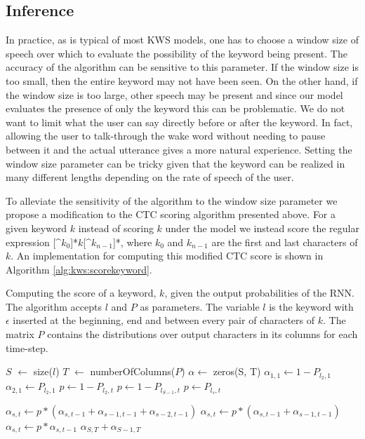 \subsection{Inference}

In practice, as is typical of most KWS models, one has to choose a window size
of speech over which to evaluate the possibility of the keyword being present.
The accuracy of the algorithm can be sensitive to this parameter. If the window
size is too small, then the entire keyword may not have been seen. On the other
hand, if the window size is too large, other speech may be present and since
our model evaluates the presence of only the keyword this can be problematic.
We do not want to limit what the user can say directly before or after the
keyword. In fact, allowing the user to talk-through the wake word without
needing to pause between it and the actual utterance gives a more natural
experience. Setting the window size parameter can be tricky given that the
keyword can be realized in many different lengths depending on the rate of
speech of the user.

To alleviate the sensitivity of the algorithm to the window size parameter we
propose a modification to the CTC scoring algorithm presented above. For a
given keyword $k$ instead of scoring $k$ under the model we instead score the
regular expression [\^{}$k_0$]*$k$[\^{}$k_{n-1}$]*, where $k_0$ and $k_{n-1}$
are the first and last characters of $k$. An implementation for computing this
modified CTC score is shown in Algorithm \ref{alg:kws:scorekeyword}.

\begin{algorithm}
\caption{Computing the score of a keyword, $k$, given the output probabilities
         of the RNN. The algorithm accepts $l$ and $P$ as parameters. The variable
         $l$ is the keyword with $\epsilon$ inserted at the beginning, end and
         between every pair of characters of $k$. The matrix $P$ contains the
         distributions over output characters in its columns for each time-step.}
\label{alg:scorekeyword}
\begin{algorithmic}
\State $S$ $\gets$ size($l$)
\State $T$ $\gets$ numberOfColumns($P$)
\State $\alpha \gets$ zeros(S, T)
\State $\alpha_{1, 1} \gets 1 - P_{l_2, 1}$
\State $\alpha_{2, 1} \gets P_{l_{2}, 1}$
                \State $p \gets 1 - P_{l_2, t}$
                \State $p \gets 1 - P_{l_{S - 1}, t}$
            \Else
                \State $p \gets P_{l_{s}, t}$
            \EndIf
            
                \State $\alpha_{s, t} \gets p * (\alpha_{s, t-1} + \alpha_{s-1, t-1} + \alpha_{s-2, t-1})$
                \State $\alpha_{s, t} \gets p * (\alpha_{s, t-1} + \alpha_{s-1, t-1})$
            \Else
                \State $\alpha_{s, t} \gets p * \alpha_{s, t-1}$
            \EndIf
        \EndFor
    \EndFor
    \State \Return $\alpha_{S, T} + \alpha_{S-1, T}$
\EndFunction
\end{algorithmic}
\end{algorithm}

